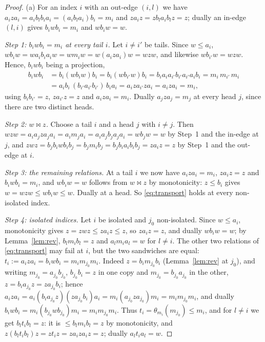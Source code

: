 \documentclass[11pt]{amsart}
\theoremstyle{definition}
\newcommand{\mt}{\bowtie}      %
\begin{document}
\begin{proof}
(a) For an index $i$ with an out-edge $(i,l)$ we have $a_iza_i=a_ib_lb_ia_i=(a_ib_la_i)b_i=m_i$ and $za_iz=zb_la_ib_lz=z$; dually an in-edge $(l,i)$ gives $b_iwb_i=m_i$ and $wb_iw=w$.

\emph{Step 1: $b_iwb_i=m_i$ at every tail $i$.} Let $i\ne i'$ be tails. Since $w\le a_i$, $wb_iw=wa_ib_ia_iw=wm_iw=w(a_iza_i)w=wzw$, and likewise $wb_{i'}w=wzw$. Hence, $b_iwb_i$ being a projection,
\begin{align*}
b_iwb_i&=b_i(wb_iw)b_i=b_i(wb_{i'}w)b_i=b_ia_ia_{i'}b_{i'}a_{i'}a_ib_i=m_i\,m_{i'}\,m_i\\
&=a_ib_i\,(b_{i'}a_{i'}b_{i'})\,b_ia_i=a_iza_{i'}za_i=a_iza_i=m_i ,
\end{align*}
using $b_ib_{i'}=z$, $za_{i'}z=z$ and $a_iza_i=m_i$. Dually $a_jza_j=m_j$ at every head $j$, since there are two distinct heads.

\emph{Step 2: $w\mt z$.} Choose a tail $i$ and a head $j$ with $i\ne j$. Then $wzw=a_ia_jza_ja_i=a_im_ja_i=a_ia_jb_ja_ja_i=wb_jw=w$ by Step~1 and the in-edge at $j$, and $zwz=b_jb_iwb_ib_j=b_jm_ib_j=b_jb_ia_ib_ib_j=za_iz=z$ by Step~1 and the out-edge at $i$.

\emph{Step 3: the remaining relations.} At a tail $i$ we now have $a_iza_i=m_i$, $za_iz=z$ and $b_iwb_i=m_i$, and $wb_iw=w$ follows from $w\mt z$ by monotonicity: $z\le b_i$ gives $w=wzw\le wb_iw\le w$. Dually at a head. So \eqref{eq:transport} holds at every non-isolated index.

\emph{Step 4: isolated indices.} Let $i$ be isolated and $j_0$ non-isolated. Since $w\le a_i$, monotonicity gives $z=zwz\le za_iz\le z$, so $za_iz=z$, and dually $wb_iw=w$; by Lemma~\ref{lem:rev}, $b_lm_ib_l=z$ and $a_lm_ia_l=w$ for $l\ne i$. The other two relations of \eqref{eq:transport} may fail at $i$, but the two sandwiches are equal: $t_i:=a_iza_i=b_iwb_i=m_im_{j_0}m_i$. Indeed $z=b_im_{j_0}b_i$ (Lemma~\ref{lem:rev} at $j_0$), and writing $m_{j_0}=a_{j_0}b_{j_0}$, $b_{j_0}b_i=z$ in one copy and $m_{j_0}=b_{j_0}a_{j_0}$ in the other, $z=b_ia_{j_0}z=za_{j_0}b_i$; hence $a_iza_i=a_i(b_ia_{j_0}z)(za_{j_0}b_i)a_i=m_i(a_{j_0}za_{j_0})m_i=m_im_{j_0}m_i$, and dually $b_iwb_i=m_i(b_{j_0}wb_{j_0})m_i=m_im_{j_0}m_i$. Thus $t_i=\theta_{m_i}(m_{j_0})\le m_i$, and for $l\ne i$ we get $b_lt_ib_l=z$: it is $\le b_lm_ib_l=z$ by monotonicity, and $z(b_lt_ib_l)z=zt_iz=za_iza_iz=z$; dually $a_lt_ia_l=w$.


\end{proof}
\end{document}
